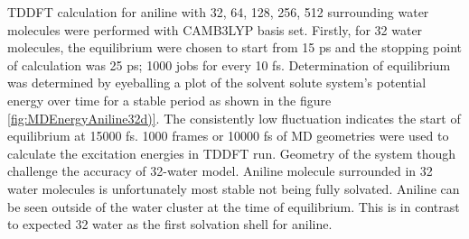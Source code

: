 \documentclass[
journal=jpcbfk, %
manuscript=article]{achemso}
\begin{document}
TDDFT calculation for aniline with 32, 64, 128, 256, 512 surrounding water molecules were performed with CAMB3LYP basis set. Firstly, for 32 water molecules, the equilibrium were chosen to start from 15 ps and the stopping point of calculation was 25 ps; 1000 jobs for every 10 fs. Determination of equilibrium was determined by eyeballing a plot of the solvent solute system's potential energy over time for a stable period as shown in the figure \ref{fig:MDEnergyAniline32d)}. The consistently low fluctuation indicates the start of equilibrium at 15000 fs. 1000 frames or 10000 fs of MD geometries were used to calculate the excitation energies in TDDFT run. Geometry of the system though challenge the accuracy of 32-water model. Aniline molecule surrounded in 32 water molecules is unfortunately most stable not being fully solvated. Aniline can be seen outside of the water cluster at the time of equilibrium. This is in contrast to expected 32 water as the first solvation shell for aniline. \cite{Plugatyr2009} 
\end{document}
